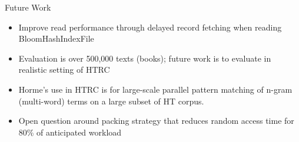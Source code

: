 \documentclass[newPxFont]{beamer}
\begin{document}
\begin{frame}[c]{Future Work}

  \begin{itemize}
    \item Improve read performance through delayed record fetching when reading BloomHashIndexFile
    \item Evaluation is over 500,000 texts (books); future work is to evaluate in realistic setting of HTRC 
    \item Horme's use in HTRC is for large-scale parallel pattern matching of n-gram (multi-word) terms on a large subset of HT corpus.  
    \item Open question around packing strategy that reduces random access time for 80\% of anticipated workload
  \end{itemize}
\end{frame}
\end{document}
